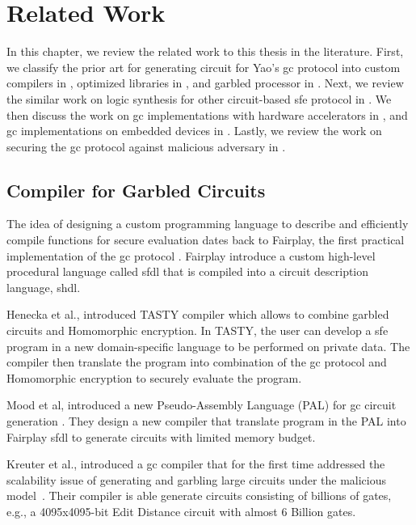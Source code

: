 \chapter{Related Work}\label{chap:related}
In this chapter, we review the related work to this thesis in the literature.
First, we classify the prior art for generating circuit for Yao's \acrfull{gc} protocol into custom compilers in , optimized libraries in , and garbled processor in .
Next, we review the similar work on logic synthesis for other circuit-based \acrshort{sfe} protocol in .
We then discuss the work on \acrshort{gc} implementations with hardware accelerators in , and \acrshort{gc} implementations on embedded devices in .
Lastly, we review the work on securing the \acrshort{gc} protocol against malicious adversary in .

\section{Compiler for Garbled Circuits}\label{sec:related-compiler}
The idea of designing a custom programming language to describe and efficiently compile functions for secure evaluation dates back to Fairplay, the first practical implementation of the \acrshort{gc} protocol \cite{malkhi2004fairplay}.
Fairplay introduce a custom high-level procedural language called \acrfull{sfdl} that is compiled into a circuit description language, \acrfull{shdl}.

Henecka et al., introduced TASTY compiler \cite{henecka2010tasty} which allows to combine garbled circuits and Homomorphic encryption.
In TASTY, the user can develop a \acrshort{sfe} program in a new domain-specific language to be performed on private data.
The compiler then translate the program into combination of the \acrshort{gc} protocol and Homomorphic encryption to securely evaluate the program.

Mood et al, introduced a new Pseudo-Assembly Language (PAL) for \acrshort{gc} circuit generation \cite{mood2012memory}.
They design a new compiler that translate program in the PAL into Fairplay \acrshort{sfdl} to generate circuits with limited memory budget.

Kreuter et al., introduced a \acrshort{gc} compiler that for the first time addressed the scalability issue of generating and garbling large circuits under the malicious model~\cite{kreuter2012billion}.
Their compiler is able generate circuits consisting of billions of gates, e.g., a 4095x4095-bit Edit Distance circuit with almost 6 Billion gates.

